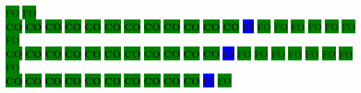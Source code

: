 \colorbox{green}{\color[gray]{0.75}FO}%
\colorbox{green}{\color[gray]{0.75}FO}%
\\
\colorbox{green}{\color[rgb]{0,0,0}\textbf{CO}}%
\colorbox{green}{\color[rgb]{0,0,0}\textbf{CO}}%
\colorbox{green}{\color[rgb]{0,0,0}\textbf{CO}}%
\colorbox{green}{\color[rgb]{0,0,0}\textbf{CO}}%
\colorbox{green}{\color[rgb]{0,0,0}\textbf{CO}}%
\colorbox{green}{\color[rgb]{0,0,0}\textbf{CO}}%
\colorbox{green}{\color[rgb]{0,0,0}\textbf{CO}}%
\colorbox{green}{\color[rgb]{0,0,0}\textbf{CO}}%
\colorbox{green}{\color[rgb]{0,0,0}\textbf{CO}}%
\colorbox{green}{\color[rgb]{0,0,0}\textbf{CO}}%
\colorbox{green}{\color[rgb]{0,0,0}\textbf{CO}}%
\colorbox{green}{\color[rgb]{0,0,0}\textbf{CO}}%
\colorbox{blue}{\color[rgb]{1,0,0}\textbf{05}}%
\colorbox{green}{\color[gray]{0.75}FO}%
\colorbox{green}{\color[gray]{0.75}FO}%
\colorbox{green}{\color[gray]{0.75}FO}%
\colorbox{green}{\color[gray]{0.75}FO}%
\colorbox{green}{\color[gray]{0.75}FO}%
\colorbox{green}{\color[gray]{0.75}FO}%
\colorbox{green}{\color[gray]{0.75}FO}%
\\
\colorbox{green}{\color[rgb]{0,0,0}\textbf{CO}}%
\colorbox{green}{\color[rgb]{0,0,0}\textbf{CO}}%
\colorbox{green}{\color[rgb]{0,0,0}\textbf{CO}}%
\colorbox{green}{\color[rgb]{0,0,0}\textbf{CO}}%
\colorbox{green}{\color[rgb]{0,0,0}\textbf{CO}}%
\colorbox{green}{\color[rgb]{0,0,0}\textbf{CO}}%
\colorbox{green}{\color[rgb]{0,0,0}\textbf{CO}}%
\colorbox{green}{\color[rgb]{0,0,0}\textbf{CO}}%
\colorbox{green}{\color[rgb]{0,0,0}\textbf{CO}}%
\colorbox{green}{\color[rgb]{0,0,0}\textbf{CO}}%
\colorbox{green}{\color[rgb]{0,0,0}\textbf{CO}}%
\colorbox{blue}{\color[rgb]{1,0,0}\textbf{03}}%
\colorbox{green}{\color[gray]{0.75}FO}%
\colorbox{green}{\color[gray]{0.75}FO}%
\colorbox{green}{\color[gray]{0.75}FO}%
\colorbox{green}{\color[gray]{0.75}FO}%
\colorbox{green}{\color[gray]{0.75}FO}%
\colorbox{green}{\color[gray]{0.75}FO}%
\colorbox{green}{\color[gray]{0.75}FO}%
\colorbox{green}{\color[gray]{0.75}FO}%
\\
\colorbox{green}{\color[rgb]{0,0,0}\textbf{CO}}%
\colorbox{green}{\color[rgb]{0,0,0}\textbf{CO}}%
\colorbox{green}{\color[rgb]{0,0,0}\textbf{CO}}%
\colorbox{green}{\color[rgb]{0,0,0}\textbf{CO}}%
\colorbox{green}{\color[rgb]{0,0,0}\textbf{CO}}%
\colorbox{green}{\color[rgb]{0,0,0}\textbf{CO}}%
\colorbox{green}{\color[rgb]{0,0,0}\textbf{CO}}%
\colorbox{green}{\color[rgb]{0,0,0}\textbf{CO}}%
\colorbox{green}{\color[rgb]{0,0,0}\textbf{CO}}%
\colorbox{green}{\color[rgb]{0,0,0}\textbf{CO}}%
\colorbox{blue}{\color[rgb]{1,0,0}\textbf{01}}%
\colorbox{green}{\color[gray]{0.75}FO}%
